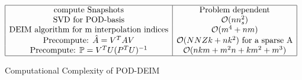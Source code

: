 \begin{table}[H]
\begin{center}


$\begin{array}{|c|c|}
\hline
\text{compute Snapshots} & \text{Problem dependent} \\
  \text{SVD for POD-basis} & \mathcal{O}(nn_s^2) \\
  \text{DEIM algorithm for m interpolation indices} & \mathcal{O}(m^4+nm) \\
  \text{Precompute: } \hat{A} = V^TAV & \mathcal{O}(NNZk+nk^2)  \text{ for a sparse A} \\
  \text{Precompute: } \mathbb{P} = V^TU(P^TU)^{-1} & \mathcal{O}(nkm + m^2n + km^2 + m^3)\\
\hline
\end{array}$
\end{center}
\caption{Computational Complexity of POD-DEIM}
 \label{Chapter2:tablecomplex}
\end{table}


